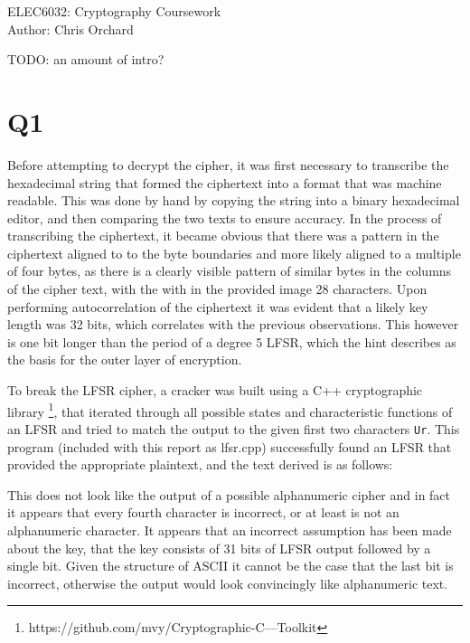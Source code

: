 \documentclass[pdflatex, a4paper,12pt]{article}
\begin{document}
\begin{center}
{\LARGE ELEC6032: Cryptography Coursework}\\[1em]

Author: Chris Orchard\\
\end{center}

TODO: an amount of intro?

\section{Q1}

Before attempting to decrypt the cipher, it was first necessary to transcribe
the hexadecimal string that formed the ciphertext into a format that was machine
readable. This was done by hand by copying the string into a binary hexadecimal
editor, and then comparing the two texts to ensure accuracy. In the process of
transcribing the ciphertext, it became obvious that there was a pattern in the
ciphertext aligned to to the byte boundaries and more likely aligned to a
multiple of four bytes, as there is a clearly visible pattern of similar bytes
in the columns of the cipher text, with the with in the provided image 28
characters. Upon performing autocorrelation of the ciphertext it was evident
that a likely key length was 32 bits, which correlates with the previous
observations. This however is one bit longer than the period of a degree 5 LFSR,
which the hint describes as the basis for the outer layer of encryption.

To break the LFSR cipher, a cracker was built using a C++ cryptographic library
\footnote[1]{https://github.com/mvy/Cryptographic-C---Toolkit}, that iterated
through all possible states and characteristic functions of an LFSR and tried to
match the output to the given first two characters \verb+Ur+. This program
(included with this report as lfsr.cpp) successfully found an LFSR that provided
the appropriate plaintext, and the text derived is as follows:

\begin{quote}

\end{quote}

This does not look like the output of a possible alphanumeric cipher and in
fact it appears that every fourth character is incorrect, or at least is not an
alphanumeric character. It appears that an incorrect assumption has been made
about the key, that the key consists of 31 bits of LFSR output followed by a
single bit. Given the structure of ASCII it cannot be the case that the last bit
is incorrect, otherwise the output would look convincingly like alphanumeric text. 
\end{document}
